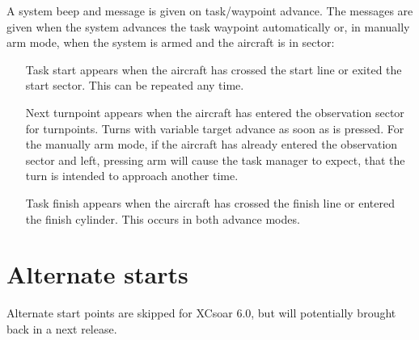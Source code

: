 A system beep and message is given on task/waypoint advance.  The
messages are given when the system advances the task waypoint
automatically or, in manually arm mode, when the system is armed and the
aircraft is in sector:
\begin{itemize}
\item[Task start]  appears when the aircraft has crossed the start line or
 exited the start sector. This can be repeated any time.
\item[Next turnpoint]  appears when the aircraft has entered the observation
 sector for turnpoints. Turns with variable target advance as soon as
  is pressed.  For the manually arm mode, if the
 aircraft has already entered the observation sector and left, pressing arm will
 cause the task manager to expect, that the turn is intended to approach
 another time.
\item[Task finish]  appears when the aircraft has crossed the finish line
 or entered the finish cylinder.  This occurs in both advance modes. 
\end{itemize}


\section{Alternate starts}\label{sec:alternate-starts}

Alternate start points are skipped for XCsoar 6.0, but
will potentially brought back in a next release. 


  

  

